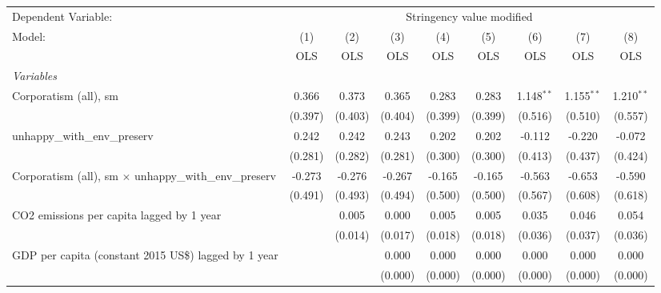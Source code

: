 
\begingroup
\centering
\begin{tabular}{lcccccccc}
   \toprule
   Dependent Variable: & \multicolumn{8}{c}{Stringency value modified}\\
   Model:                                                         & (1)     & (2)     & (3)     & (4)     & (5)     & (6)           & (7)          & (8)\\  
                                                                  &  OLS    & OLS     & OLS     & OLS     & OLS     & OLS           & OLS          & OLS\\  
   \midrule
   \emph{Variables}\\
   Corporatism (all), sm                                          & 0.366   & 0.373   & 0.365   & 0.283   & 0.283   & 1.148$^{**}$  & 1.155$^{**}$ & 1.210$^{**}$\\   
                                                                  & (0.397) & (0.403) & (0.404) & (0.399) & (0.399) & (0.516)       & (0.510)      & (0.557)\\   
   unhappy\_with\_env\_preserv                                    & 0.242   & 0.242   & 0.243   & 0.202   & 0.202   & -0.112        & -0.220       & -0.072\\   
                                                                  & (0.281) & (0.282) & (0.281) & (0.300) & (0.300) & (0.413)       & (0.437)      & (0.424)\\   
   Corporatism (all), sm $\times$ unhappy\_with\_env\_preserv     & -0.273  & -0.276  & -0.267  & -0.165  & -0.165  & -0.563        & -0.653       & -0.590\\   
                                                                  & (0.491) & (0.493) & (0.494) & (0.500) & (0.500) & (0.567)       & (0.608)      & (0.618)\\   
   CO2 emissions per capita lagged by 1 year                      &         & 0.005   & 0.000   & 0.005   & 0.005   & 0.035         & 0.046        & 0.054\\   
                                                                  &         & (0.014) & (0.017) & (0.018) & (0.018) & (0.036)       & (0.037)      & (0.036)\\   
   GDP per capita (constant 2015 US\$) lagged by 1 year           &         &         & 0.000   & 0.000   & 0.000   & 0.000         & 0.000        & 0.000\\   
                                                                  &         &         & (0.000) & (0.000) & (0.000) & (0.000)       & (0.000)      & (0.000)\\   

\end{tabular}
